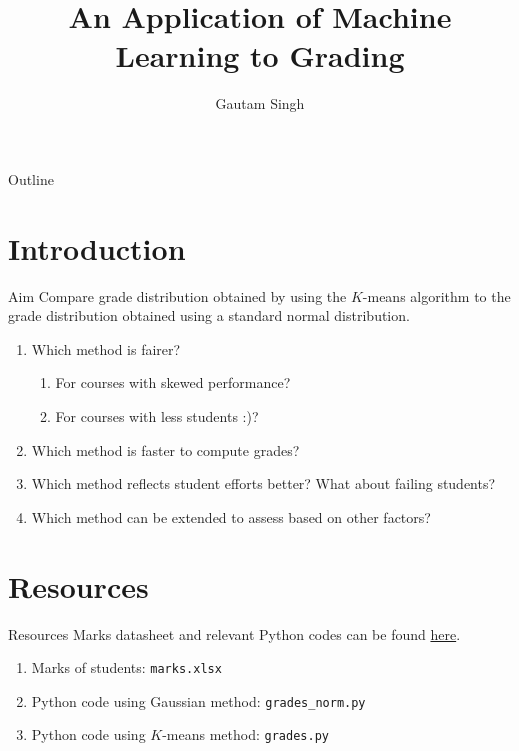 \documentclass{beamer}
\title[Machine Learning for Student Evaluation]{An Application of Machine Learning to Grading}
\author{Gautam Singh}
\theoremstyle{remark}
\begin{document}
\begin{frame}
    \titlepage 
\end{frame}

\logo{}

\begin{frame}{Outline}
    \tableofcontents
\end{frame}


\section{Introduction}
\begin{frame}{Aim}
    Compare grade distribution obtained by using the $K$-means algorithm to 
    the grade distribution obtained using a standard normal distribution.
    \pause
    \begin{enumerate}
        \item Which method is fairer?
        \pause
        \begin{enumerate}
            \item For courses with skewed performance?
            \pause
            \item For courses with less students :)?
        \end{enumerate}
        \pause
        \item Which method is faster to compute grades?
        \pause
        \item Which method reflects student efforts better? What about failing 
        students?
        \pause
        \item Which method can be extended to assess based on other factors?
    \end{enumerate}
\end{frame}

\section{Resources}
\begin{frame}{Resources}
Marks datasheet and relevant Python codes can be found 
\href{https://github.com/goats-9/ee2802-assignments/tree/main/grading/codes}{here}.
\begin{enumerate}
    \item Marks of students: \texttt{marks.xlsx}
    \item Python code using Gaussian method: \texttt{grades\_norm.py}
    \item Python code using $K$-means method: \texttt{grades.py}
\end{enumerate}
\end{frame}
\end{document}
